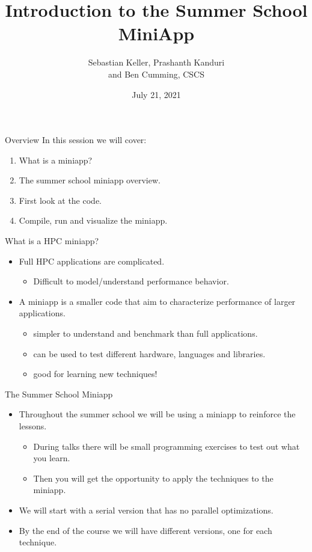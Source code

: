 \documentclass[aspectratio=43]{beamer}
\author{Sebastian Keller, Prashanth Kanduri\\ and Ben Cumming, CSCS}
\title{Introduction to the Summer School MiniApp}
\subtitle{}
\date{July 21, 2021}
\begin{document}
\cscstitle

\begin{frame}[fragile]{Overview}
    In this session we will cover:
    \begin{enumerate}
        \item What is a miniapp?
        \item The summer school miniapp overview.
        \item First look at the code.
        \item Compile, run and visualize the miniapp.
    \end{enumerate}
\end{frame}

\begin{frame}[fragile]{What is a HPC miniapp?}
    \begin{itemize}
        \item Full HPC applications are complicated.
        \begin{itemize}
            \item Difficult to model/understand performance behavior.
        \end{itemize}
        \item A miniapp is a smaller code that aim to characterize performance of larger applications.
        \begin{itemize}
            \item simpler to understand and benchmark than full applications.
            \item can be used to test different hardware, languages and libraries.
            \item good for learning new techniques!
        \end{itemize}
    \end{itemize}
\end{frame}

\begin{frame}[fragile]{The Summer School Miniapp}
    \begin{itemize}
        \item Throughout the summer school we will be using a  miniapp to reinforce the lessons.
        \begin{itemize}
            \item During talks there will be small programming exercises to  test out what you learn.
            \item Then you will get the opportunity to apply the techniques  to the miniapp.
        \end{itemize}
        \item We will start with a serial version that has no parallel  optimizations.
        \item By the end of the course we will have different  versions, one for each technique.
    \end{itemize}
\end{frame}
\end{document}
